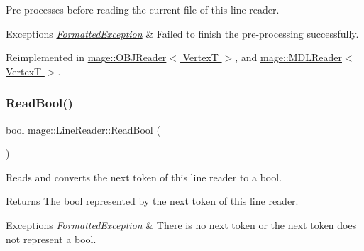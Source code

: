 Pre-\/processes before reading the current file of this line reader.


\begin{DoxyExceptions}{Exceptions}
{\em \hyperlink{classmage_1_1_formatted_exception}{Formatted\+Exception}} & Failed to finish the pre-\/processing successfully. \\
\hline
\end{DoxyExceptions}


Reimplemented in \hyperlink{classmage_1_1_o_b_j_reader_ae3a3ad3b50f1dd8dffe3109fc7dc2937}{mage\+::\+O\+B\+J\+Reader$<$ Vertex\+T $>$}, and \hyperlink{classmage_1_1_m_d_l_reader_a8b99fb3bdea5e9dae156b135c160c22d}{mage\+::\+M\+D\+L\+Reader$<$ Vertex\+T $>$}.

\hypertarget{classmage_1_1_line_reader_a86289c358afe9b3bc5c7789bb8a6af95}{}\label{classmage_1_1_line_reader_a86289c358afe9b3bc5c7789bb8a6af95} 
\subsubsection{\texorpdfstring{Read\+Bool()}{ReadBool()}}
{\footnotesize\ttfamily bool mage\+::\+Line\+Reader\+::\+Read\+Bool (\begin{DoxyParamCaption}{ }\end{DoxyParamCaption})\hspace{0.3cm}{\ttfamily [protected]}}

Reads and converts the next token of this line reader to a {\ttfamily bool}.

\begin{DoxyReturn}{Returns}
The {\ttfamily bool} represented by the next token of this line reader. 
\end{DoxyReturn}

\begin{DoxyExceptions}{Exceptions}
{\em \hyperlink{classmage_1_1_formatted_exception}{Formatted\+Exception}} & There is no next token or the next token does not represent a {\ttfamily bool}. \\
\hline
\end{DoxyExceptions}
\hypertarget{classmage_1_1_line_reader_ad915c1a17549c7758c10f0b6db7e5611}{}\label{classmage_1_1_line_reader_ad915c1a17549c7758c10f0b6db7e5611} 
